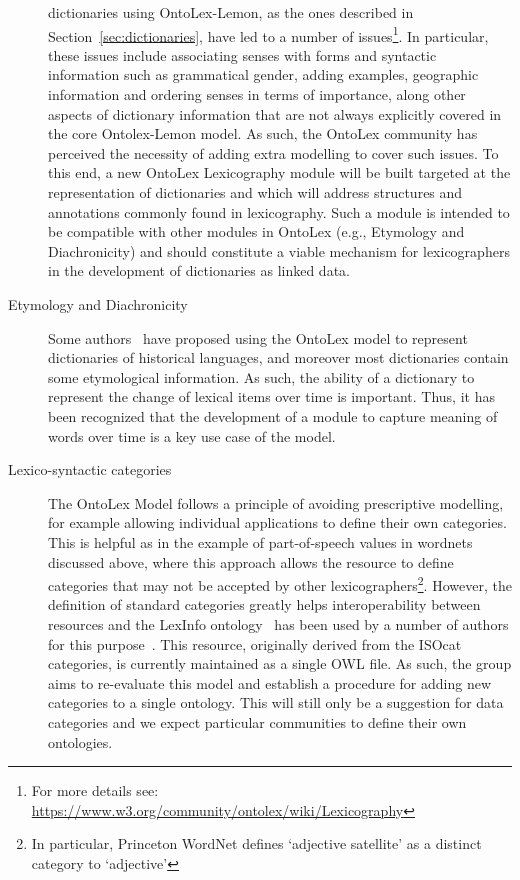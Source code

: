 \documentclass[12pt,a4paper]{elex2017}
\begin{document}
\begin{description}
dictionaries using OntoLex-Lemon, as the ones described in
Section~\ref{sec:dictionaries}, have led to a number of issues\footnote{For more
details see: \url{https://www.w3.org/community/ontolex/wiki/Lexicography}}. In
particular, these issues include associating senses with forms and syntactic
information such as grammatical gender, adding examples, geographic information
and ordering senses in terms of importance, along other aspects of dictionary
information that are not always explicitly covered in the core Ontolex-Lemon
model. As such, the OntoLex community has perceived the necessity of adding
extra modelling to cover such issues. To this end, a new OntoLex Lexicography
module will be built targeted at the representation of dictionaries and which
will address structures and annotations commonly found in lexicography. Such a
module is intended to be compatible with other modules in OntoLex (e.g.,
Etymology and Diachronicity) and should constitute a viable mechanism for
lexicographers in the development of dictionaries as linked data.
    \item[Etymology and Diachronicity] Some authors~\citep{khan2014using,abromeit2016linking} have
        proposed using the OntoLex model to represent dictionaries of historical
        languages, and moreover most dictionaries contain some etymological
        information. As such, the ability of a dictionary to represent the
        change of lexical items over time is important. Thus, it has been
        recognized that the development of a module to capture meaning of words
        over time is a key use case of the model.
    \item[Lexico-syntactic categories] The OntoLex Model follows a principle of
        avoiding prescriptive modelling, for example allowing individual
        applications
        to define their own categories. This is helpful as in the example
        of part-of-speech values in wordnets discussed above, where this
        approach allows the resource to define categories that may not be
        accepted by other lexicographers\footnote{In particular, Princeton
        WordNet defines `adjective satellite' as a distinct category to
        `adjective'}. However, the definition of standard categories greatly
        helps interoperability between resources and the LexInfo
        ontology~\citep{cimiano2011lexinfo} has been used by a number of authors
        for this
        purpose~\citep{buitelaar2013linguistic,villegas2015parole,serasset2015dbnary}. 
        This resource, originally derived from the
        ISOcat~\citep{kemps2008isocat} categories, is currently maintained as a
        single OWL file. As such, the group aims to re-evaluate this model and
        establish a procedure for adding new categories to a single
        ontology. This will still only be a suggestion for data categories
        and we expect particular communities to define their own ontologies.
\end{description}
\end{document}
